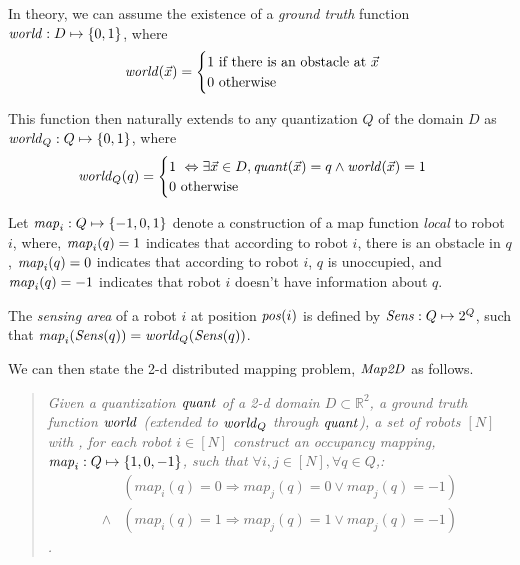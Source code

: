 In theory, we can assume the existence of a \emph{ground truth} function $\mathit{world} : D\mapsto \left\{0,1\right\}$, where $$\mathit{world}(\Vec{x}) = \begin{cases}
1\ \mbox{if there is an obstacle at }\Vec{x}\\
0\ \mbox{otherwise}
\end{cases}
$$

This function then naturally extends to any quantization $Q$ of the domain $D$ as 
$\mathit{world}_Q : Q \mapsto \left\{0,1\right\}$, where $$\mathit{world}_Q(q) = \begin{cases}
1\ \Leftrightarrow \exists \Vec{x}\in D, \mathit{quant}(\Vec{x}) = q \wedge \mathit{world}(\Vec{x}) = 1 \\
0\ \mbox{otherwise}
\end{cases}
$$

Let $\mathit{map}_i:Q\mapsto \left\{-1,0,1\right\}$ denote a construction of a map function \emph{local} to robot $i$, where, $\mathit{map}_i(q) = 1$ indicates that according to robot $i$, there is an obstacle in $q$, $\mathit{map}_i(q) = 0$ indicates that according to robot $i$, $q$ is unoccupied, and $\mathit{map}_i(q) = -1$ indicates that robot $i$ doesn't have information about $q$. 

\begin{definition} The \emph{sensing area} of a robot $i$ at position $\mathit{pos}(i)$ is defined by $\mathit{Sens}: Q \mapsto 2^{Q}$, such that $\mathit{map}_i(\mathit{Sens}(q)) = \mathit{world}_Q(\mathit{Sens}(q))$.  
  \end{definition}


We can then state the 2-d distributed mapping problem, $\mathit{Map2D}$ as follows. \begin{quote}
 {\em Given a quantization $\mathit{quant}$ of a 2-d domain $D\subset \mathbb{R}^2$, a ground truth function $\mathit{world}$ (extended to $\mathit{world}_Q$ through $\mathit{quant}$), a set of robots $[N]$ with , for each robot $i \in [N]$ construct an occupancy mapping, $\mathit{map}_i: Q \mapsto \left\{1,0,-1\right\}$, such that $\forall i , j \in [N], \forall q \in Q$,:
 \begin{align*} & (map_i(q) = 0 \Rightarrow
 map_j(q) = 0 \vee map_j(q) = -1)\\ \wedge
 &(map_i(q) = 1 \Rightarrow
 map_j(q) = 1 \vee map_j(q) = -1)\end{align*}. 
 }
\end{quote}

